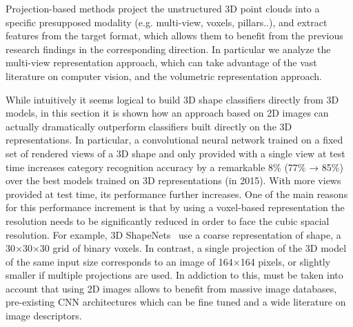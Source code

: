 Projection-based methods project the unstructured 3D point clouds into a specific presupposed modality (e.g. multi-view, voxels, pillars..), and extract features from the target format, which allows them to benefit from the previous research findings in the corresponding direction. In particular we analyze the multi-view representation approach, which can take advantage of the vast literature on computer vision, and the volumetric representation approach.

While intuitively it seems logical to build 3D shape classifiers directly from 3D models, in this section it is shown how an approach based on 2D images can actually dramatically outperform classifiers built directly on the 3D representations. In particular, a convolutional neural network trained on a fixed set of rendered views of a 3D shape and only provided with a single view at test time increases category recognition accuracy by a remarkable 8\% (77\% → 85\%) over the best models trained on 3D representations (in 2015). With more views provided at test time, its performance further increases. One of the main reasons for this performance increment is that by using a voxel-based representation the resolution needs to be significantly reduced in order to face the cubic spacial resolution. For example, 3D ShapeNets~\cite{ShapeNets} use a coarse representation of
shape, a 30×30×30 grid of binary voxels. In contrast, a single projection of the 3D model of the same input size corresponds to an image of 164×164 pixels, or slightly smaller if multiple projections are used. In addiction to this, must be taken into account that using 2D images allows to benefit from massive image databases, pre-existing CNN architectures which can be fine tuned and a wide literature on image descriptors.